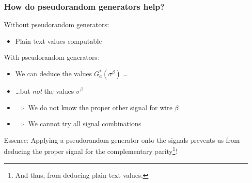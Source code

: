 \documentclass{beamer}
\begin{document}






\begin{frame}
  \frametitle{How do pseudorandom generators help?}
  Without pseudorandom generators:
  \begin{itemize}
  \item Plain-text values computable
  \end{itemize}
  With pseudorandom generators:
  \begin{itemize}
  \item We can deduce the values $G_a^*(\sigma^\beta)$ \dots
  \item \dots but \emph{not} the values $\sigma^\beta$
  \item $\Rightarrow$ We do not know the proper other signal for wire $\beta$
  \item $\Rightarrow$ We cannot try all signal combinations
  \end{itemize}
  \begin{alertblock}{Essence:}
    Applying a pseudorandom generator onto the signals prevents us from deducing the proper signal for the complementary parity\footnote{And thus, from deducing plain-text values.}!
  \end{alertblock}
\end{frame}
\end{document}
